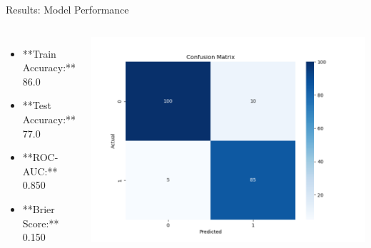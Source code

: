 \documentclass{beamer}
\begin{document}
\begin{frame}{Results: Model Performance}
  \begin{columns}
    \begin{itemize}
      \item **Train Accuracy:** 86.0%
      \item **Test Accuracy:** 77.0%
      \item **ROC-AUC:** 0.850
      \item **Brier Score:** 0.150
    \end{itemize}
    \includegraphics[width=\textwidth]{../reports/plots/confusion_matrix.png}
  \end{columns}
\end{frame}
\end{document}
